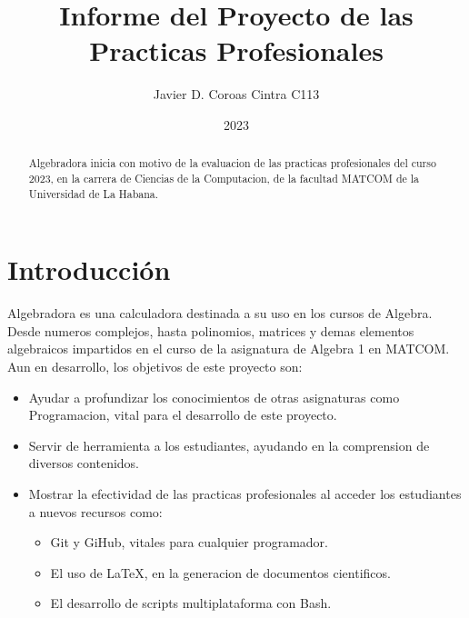 \documentclass[a4paper,12pt]{article}
\title{Informe del Proyecto de las Practicas Profesionales}
\author{Javier D. Coroas Cintra C113}
\date{2023}
\begin{document}
\maketitle

\begin{abstract}
    Algebradora inicia con motivo de la evaluacion de las practicas profesionales del curso 2023, en la carrera de Ciencias de la Computacion, de la facultad MATCOM de la Universidad de La Habana.
\end{abstract}

\section{Introducción}

Algebradora es una calculadora destinada a su uso en los cursos de Algebra. Desde numeros complejos, hasta polinomios, matrices y demas elementos algebraicos impartidos en el curso de la asignatura de Algebra 1 en MATCOM. Aun en desarrollo, los objetivos de este proyecto son:

\begin{itemize}
    \item Ayudar a profundizar los conocimientos de otras asignaturas como Programacion, vital para el desarrollo de este proyecto.
    \item Servir de herramienta a los estudiantes, ayudando en la comprension de diversos contenidos.
    \item Mostrar la efectividad de las practicas profesionales al acceder los estudiantes a nuevos recursos como:
          \begin{itemize}
              \item Git y GiHub, vitales para cualquier programador.
              \item El uso de \LaTeX, en la generacion de documentos cientificos.
              \item El desarrollo de scripts multiplataforma con Bash.
          \end{itemize}
\end{itemize}

\newpage
\end{document}
